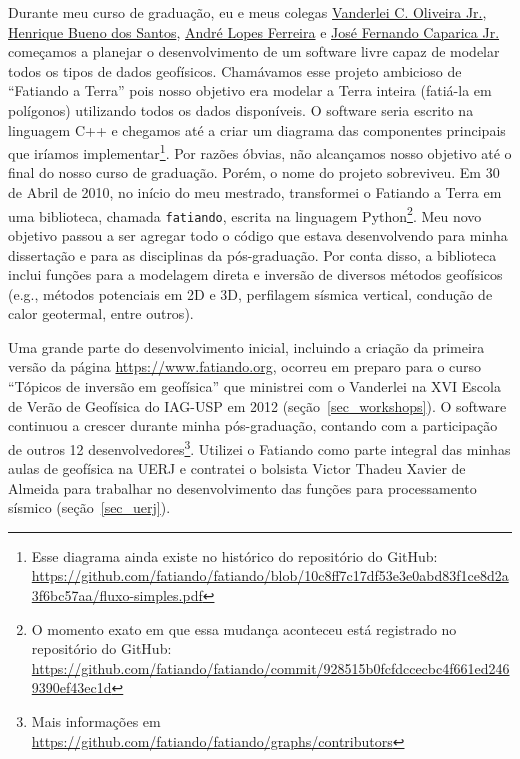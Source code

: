 \documentclass[10pt,a4paper,oneside]{book}
\begin{document}
Durante meu curso de graduação, eu e meus colegas
\href{https://www.pinga-lab.org/people/oliveira-jr.html}{Vanderlei C. Oliveira Jr.},
\href{https://www.linkedin.com/in/hbuenos/}{Henrique Bueno dos Santos},
\href{https://www.linkedin.com/in/andr%C3%A9-ferreira-lopes/}{André Lopes Ferreira} e
\href{https://www.linkedin.com/in/josecaparica/}{José Fernando Caparica Jr.}
começamos a planejar o desenvolvimento de um software livre capaz de modelar
todos os tipos de dados geofísicos.
Chamávamos esse projeto ambicioso de ``Fatiando a Terra'' pois nosso objetivo
era modelar a Terra inteira (fatiá-la em polígonos) utilizando todos os dados
disponíveis.
O software seria escrito na linguagem C++ e chegamos até a criar um diagrama
das componentes principais que iríamos implementar\footnote{Esse diagrama ainda
existe no histórico do repositório do GitHub: \url{https://github.com/fatiando/fatiando/blob/10c8ff7c17df53e3e0abd83f1ce8d2a3f6bc57aa/fluxo-simples.pdf}}.
Por razões óbvias, não alcançamos nosso objetivo até o final do nosso curso de
graduação.
Porém, o nome do projeto sobreviveu.
Em 30 de Abril de 2010, no início do
meu mestrado, transformei o Fatiando a Terra em uma biblioteca, chamada
\texttt{fatiando}, escrita na linguagem Python\footnote{O momento exato em que
essa mudança aconteceu está registrado no repositório do GitHub:
\url{https://github.com/fatiando/fatiando/commit/928515b0fcfdccecbc4f661ed2469390ef43ec1d}}.
Meu novo objetivo passou a ser agregar todo o código que estava desenvolvendo
para minha dissertação e para as disciplinas da pós-graduação.
Por conta disso, a biblioteca inclui funções para a modelagem direta e inversão
de diversos métodos geofísicos (e.g., métodos potenciais em 2D e 3D, perfilagem
sísmica vertical, condução de calor geotermal, entre outros).

Uma grande parte do desenvolvimento inicial, incluindo a criação da primeira
versão da página \url{https://www.fatiando.org}, ocorreu em preparo para o
curso ``Tópicos de inversão em geofísica'' que ministrei com o Vanderlei na XVI
Escola de Verão de Geofísica do IAG-USP em 2012 (seção~\ref{sec_workshops}).
O software continuou a crescer durante minha pós-graduação, contando com a
participação de outros 12 desenvolvedores\footnote{Mais informações em
\url{https://github.com/fatiando/fatiando/graphs/contributors}}.
Utilizei o Fatiando como parte integral das minhas aulas de geofísica na
UERJ e contratei o bolsista Victor Thadeu Xavier de Almeida para trabalhar no
desenvolvimento das funções para processamento sísmico (seção~\ref{sec_uerj}).
\end{document}
